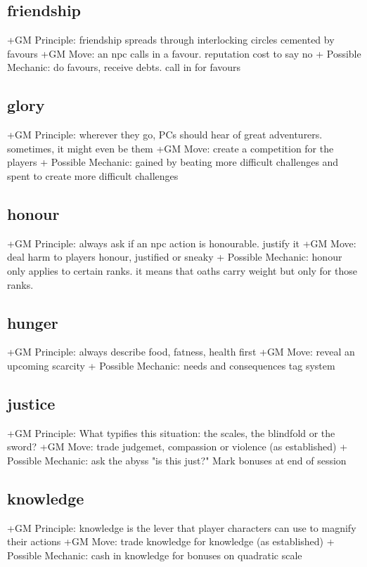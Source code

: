 \documentclass{tufte-handout}
\begin{document}
\subsection{friendship}
+GM Principle: friendship spreads through interlocking circles cemented by favours
+GM Move: an npc calls in a favour. reputation cost to say no 
+ Possible Mechanic: do favours, receive debts. call in for favours
		
\subsection{glory}
+GM Principle: wherever they go, PCs should hear of great adventurers. sometimes, it might even be them
+GM Move: create a competition for the players
+ Possible Mechanic: gained by beating more difficult challenges and spent to create more difficult challenges  

\subsection{honour}
+GM Principle: always ask if an npc action is honourable. justify it
+GM Move: deal harm to players honour, justified or sneaky
+ Possible Mechanic: honour only applies to certain ranks. it means that oaths carry weight but only for those ranks.

\subsection{hunger}
+GM Principle:  always describe food, fatness, health first
+GM Move:   reveal an upcoming scarcity
+ Possible Mechanic: needs and consequences tag system

\subsection{justice}
+GM Principle: What typifies this situation: the scales, the blindfold or the sword?	
+GM Move: trade judgemet, compassion or violence (as established)
+ Possible Mechanic: ask the abyss "is this just?" Mark bonuses at end of session 

\subsection{knowledge }
+GM Principle: knowledge is the lever that player characters can use to magnify their actions	
+GM Move: trade knowledge for knowledge (as established)
+ Possible Mechanic: cash in knowledge for bonuses on quadratic scale
\end{document}

